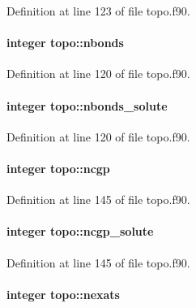 Definition at line 123 of file topo.\-f90.

\hypertarget{classtopo_a4f77c74b9498ed0ab1e72a2f82c1796f}{
\paragraph[{nbonds}]{\setlength{\rightskip}{0pt plus 5cm}integer topo\-::nbonds}}\label{classtopo_a4f77c74b9498ed0ab1e72a2f82c1796f}


Definition at line 120 of file topo.\-f90.

\hypertarget{classtopo_a827a5b6a9b9047edf57a7a0c4d1c3ed8}{
\paragraph[{nbonds\-\_\-solute}]{\setlength{\rightskip}{0pt plus 5cm}integer topo\-::nbonds\-\_\-solute}}\label{classtopo_a827a5b6a9b9047edf57a7a0c4d1c3ed8}


Definition at line 120 of file topo.\-f90.

\hypertarget{classtopo_a17bb91c0e550e12c6bfddf5de414489a}{
\paragraph[{ncgp}]{\setlength{\rightskip}{0pt plus 5cm}integer topo\-::ncgp}}\label{classtopo_a17bb91c0e550e12c6bfddf5de414489a}


Definition at line 145 of file topo.\-f90.

\hypertarget{classtopo_a3a5a2e36d89c3dd5715b85c9d074aad7}{
\paragraph[{ncgp\-\_\-solute}]{\setlength{\rightskip}{0pt plus 5cm}integer topo\-::ncgp\-\_\-solute}}\label{classtopo_a3a5a2e36d89c3dd5715b85c9d074aad7}


Definition at line 145 of file topo.\-f90.

\hypertarget{classtopo_ac511fe2f83b9f7f217045c167ea69a73}{
\paragraph[{nexats}]{\setlength{\rightskip}{0pt plus 5cm}integer topo\-::nexats}}\label{classtopo_ac511fe2f83b9f7f217045c167ea69a73}


